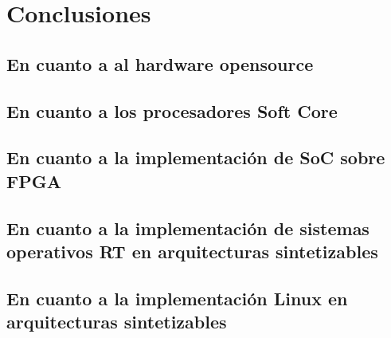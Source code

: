  \chapter{Conclusiones}

	\section{En cuanto a al hardware opensource} 


	\section{En cuanto a los procesadores Soft Core} 
	
	
	\section{En cuanto a la implementación de SoC sobre FPGA} 
		
		
	\section{En cuanto a la implementación de sistemas operativos RT en arquitecturas sintetizables} 
		
	
	\section{En cuanto a la implementación Linux en arquitecturas sintetizables} 
		

